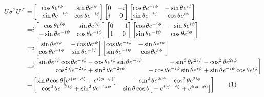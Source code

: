 \documentclass[]{article}
\newcommand\numberthis{\addtocounter{equation}{1}\tag{\theequation}}
\begin{document}
\begin{align*}
	U \sigma^2 U^T  =&  \begin{bmatrix}
		\cos{\theta} e^{i\phi}&\sin{\theta}e^{i\psi}\\
		-\sin{\theta}e^{-i\psi}&\cos{\theta} e^{-i\phi}
	\end{bmatrix} \begin{bmatrix}
		0&-i\\
		i&0
	\end{bmatrix} \begin{bmatrix}
		\cos{\theta} e^{-i\phi}&-\sin{\theta}e^{i\psi}\\
		\sin{\theta}e^{-i\psi}&\cos{\theta} e^{i\phi}
	\end{bmatrix}\\
	=&  i \begin{bmatrix}
		\cos{\theta} e^{i\phi}&\sin{\theta}e^{i\psi}\\
		-\sin{\theta}e^{-i\psi}&\cos{\theta} e^{-i\phi}
	\end{bmatrix} \begin{bmatrix}
		0&-1\\
		1&0
	\end{bmatrix} \begin{bmatrix}
		\cos{\theta} e^{-i\phi}&-\sin{\theta}e^{i\psi}\\
		\sin{\theta}e^{-i\psi}&\cos{\theta} e^{i\phi}
	\end{bmatrix}\\
	=&  i\begin{bmatrix}
		\sin{\theta}e^{i\psi}&-\cos{\theta} e^{i\phi}\\
		\cos{\theta} e^{-i\phi}&\sin{\theta}e^{-i\psi}
	\end{bmatrix} \begin{bmatrix}
		\cos{\theta} e^{-i\phi}&-\sin{\theta}e^{i\psi}\\
		\sin{\theta}e^{-i\psi}&\cos{\theta} e^{i\phi}
	\end{bmatrix}\\
   =& i \begin{bmatrix}
	   	\sin{\theta}e^{i\psi}\cos{\theta} e^{-i\phi}-\cos{\theta} e^{i\phi}\sin{\theta}e^{-i\psi}&-\sin^2{\theta}e^{2i\psi}-\cos^2{\theta} e^{2i\phi}\\
	   	\cos^2{\theta} e^{-2i\phi}+\sin^2{\theta}e^{-2i\psi}&-\cos{\theta} e^{-i\phi}\sin{\theta}e^{i\psi}+\sin{\theta}e^{-i\psi}\cos{\theta} e^{i\phi}
   \end{bmatrix} \\
	=& \begin{bmatrix}
		\sin{\theta}\cos{\theta}\big[e^{i(\psi-\phi)}+e^{i(\phi-\psi)}\big]&-\sin^2{\theta}e^{2i\psi}-\cos^2{\theta} e^{2i\phi}\\
		\cos^2{\theta} e^{-2i\phi}+\sin^2{\theta}e^{-2i\psi}&\sin{\theta}\cos{\theta}\big[-e^{i(\psi-\phi)}+e^{i(\phi-\psi)}\big]
	\end{bmatrix} \numberthis \label{eq:U:sigma2:UT}
\end{align*}
\end{document}
